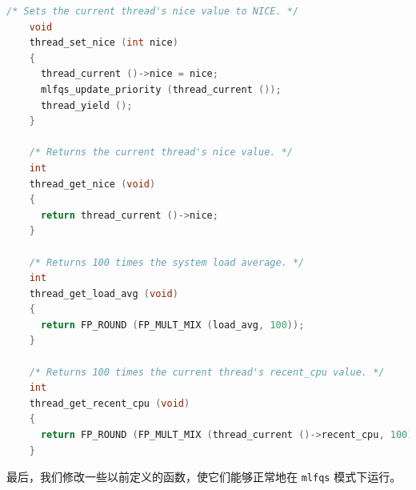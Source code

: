 \documentclass{article}
\begin{document}
\begin{lstlisting}[language=C, title=相关函数]
    /* Sets the current thread's nice value to NICE. */
    void
    thread_set_nice (int nice) 
    {
      thread_current ()->nice = nice;
      mlfqs_update_priority (thread_current ());
      thread_yield ();
    }
    
    /* Returns the current thread's nice value. */
    int
    thread_get_nice (void) 
    {
      return thread_current ()->nice;
    }
    
    /* Returns 100 times the system load average. */
    int
    thread_get_load_avg (void) 
    {
      return FP_ROUND (FP_MULT_MIX (load_avg, 100));
    }
    
    /* Returns 100 times the current thread's recent_cpu value. */
    int
    thread_get_recent_cpu (void) 
    {
      return FP_ROUND (FP_MULT_MIX (thread_current ()->recent_cpu, 100));
    }
\end{lstlisting}

最后，我们修改一些以前定义的函数，使它们能够正常地在 \texttt{mlfqs} 模式下运行。
\end{document}
